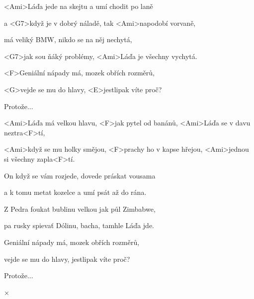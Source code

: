 

\zs
<Ami>Láďa jede na skejtu
a umí chodit po laně

a <G7>když je v dobrý náladě,
tak <Ami>napodobí vorvaně,

má veliký BMW,
nikdo se na něj nechytá,

<G7>jak sou ňáký problémy,
<Ami>Láďa je všechny vychytá.

<F>Geniální nápady má, mozek obřích rozměrů,

<G>vejde se mu do hlavy, <E>jestlipak víte proč?

Protože...
\ks

\zr
<Ami>Láďa má velkou hlavu, <F>jak pytel od banánů,
<Ami>Láďa se v davu neztra<F>tí,

<Ami>když se mu holky smějou,
<F>prachy ho v kapse hřejou,
<Ami>jednou si všechny zapla<F>tí.
\kr

\zs
On když se vám rozjede,
dovede práskat vousama

a k tomu metat kozelce
a umí psát až do rána.

Z Pedra foukat bublinu
velkou jak půl Zimbabwe,

pa rusky spievať Dólinu,
bacha, tamhle Láďa jde.

Geniální nápady má, mozek obřích rozměrů,

vejde se mu do hlavy, jestlipak víte proč?

Protože...
\ks

×\kr

\kp
